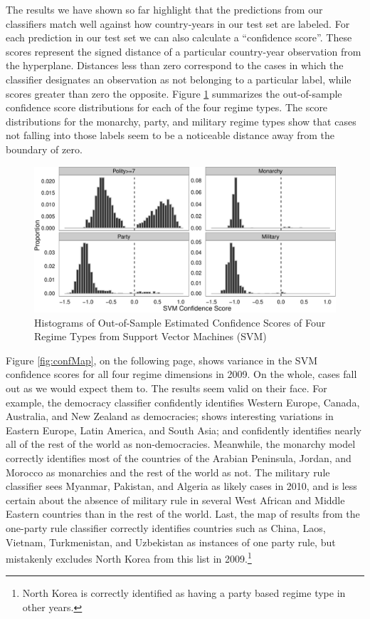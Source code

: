 \documentclass[pdftex,12pt,fullpage,oneside]{amsart}
\begin{document}
The results we have shown so far highlight that the predictions from our classifiers match well against how country-years in our test set are labeled. For each prediction in our test set we can also calculate a ``confidence score''. These scores represent the signed distance of a particular country-year observation from the hyperplane. Distances less than zero correspond to the cases in which the classifier designates an observation as not belonging to a particular label, while scores greater than zero the opposite. Figure \ref{fig:confDist} summarizes the out-of-sample confidence score distributions for each of the four regime types. The score distributions for the monarchy, party, and military regime types show that cases not falling into those labels seem to be a noticeable distance away from the boundary of zero. 

\begin{figure}[ht]
	\centering
	\includegraphics[width=1\textwidth]{pol_bin_probDist}
	\caption{Histograms of Out-of-Sample Estimated Confidence Scores of Four Regime Types from Support Vector Machines (SVM)}
	\label{fig:confDist}
\end{figure}
\FloatBarrier

Figure \ref{fig:confMap}, on the following page, shows variance in the SVM confidence scores for all four regime dimensions in 2009. On the whole, cases fall out as we would expect them to. The results seem valid on their face. For example, the democracy classifier confidently identifies Western Europe, Canada, Australia, and New Zealand as democracies; shows interesting variations in Eastern Europe, Latin America, and South Asia; and confidently identifies nearly all of the rest of the world as non-democracies. Meanwhile, the monarchy model correctly identifies most of the countries of the Arabian Peninsula, Jordan, and Morocco as monarchies and the rest of the world as not. The military rule classifier sees Myanmar, Pakistan, and Algeria as likely cases in 2010, and is less certain about the absence of military rule in several West African and Middle Eastern countries than in the rest of the world. Last, the map of results from the one-party rule classifier correctly identifies countries such as China, Laos, Vietnam, Turkmenistan, and Uzbekistan as instances of one party rule, but mistakenly excludes North Korea from this list in 2009.\footnote{North Korea is correctly identified as having a party based regime type in other years.} 
\end{document}
